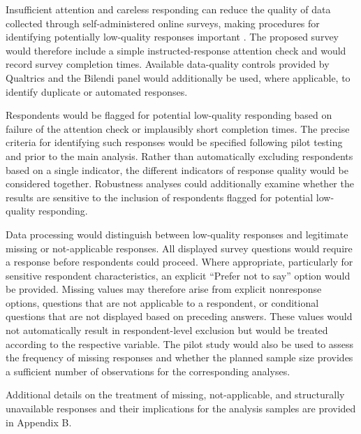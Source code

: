 Insufficient attention and careless responding can reduce the quality of data collected through self-administered online 
surveys, making procedures for identifying potentially low-quality responses important \citep{berinsky2014separating, curran2016methods}. 
The proposed survey would therefore include a simple instructed-response attention check and would record survey 
completion times. Available data-quality controls provided by Qualtrics and the Bilendi panel would additionally be used, 
where applicable, to identify duplicate or automated responses.

Respondents would be flagged for potential low-quality responding based on failure of the attention check or implausibly 
short completion times. The precise criteria for identifying such responses would be specified following pilot testing 
and prior to the main analysis. Rather than automatically excluding respondents based on a single indicator, the 
different indicators of response quality would be considered together. Robustness analyses could additionally examine 
whether the results are sensitive to the inclusion of respondents flagged for potential low-quality responding. 

Data processing would distinguish between low-quality responses and legitimate missing or not-applicable responses. 
All displayed survey questions would require a response before respondents could proceed. Where appropriate, 
particularly for sensitive respondent characteristics, an explicit “Prefer not to say” option would be provided. 
Missing values may therefore arise from explicit nonresponse options, questions that are not applicable to a 
respondent, or conditional questions that are not displayed based on preceding answers. These values would not 
automatically result in respondent-level exclusion but would be treated according to the respective variable. 
The pilot study would also be used to assess the frequency of missing responses and whether the planned sample 
size provides a sufficient number of observations for the corresponding analyses. 

Additional details on the treatment of missing, not-applicable, and structurally unavailable responses and their 
implications for the analysis samples are provided in Appendix B.